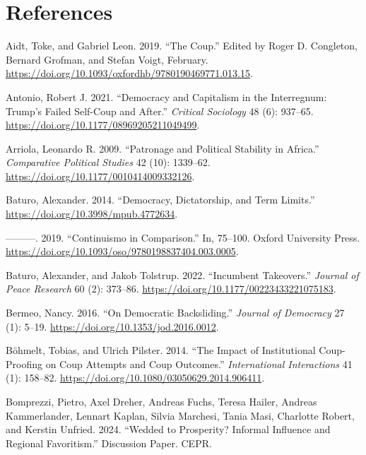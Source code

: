 \documentclass[
  12pt,
]{report}
\newlength{\cslhangindent}
\newenvironment{CSLReferences}[2] %
 {\begin{list}{}{%
  \setlength{\itemindent}{0pt}
  \setlength{\leftmargin}{0pt}
  \setlength{\parsep}{0pt}
  \ifodd #1
   \setlength{\leftmargin}{\cslhangindent}
   \setlength{\itemindent}{-1\cslhangindent}
  \fi
  \setlength{\itemsep}{#2\baselineskip}}}
 {\end{list}}
\begin{document}
\newpage

\chapter*{References}\label{references}

\label{refs}
\begin{CSLReferences}{1}{0}
Aidt, Toke, and Gabriel Leon. 2019. {``The Coup.''} Edited by Roger D.
Congleton, Bernard Grofman, and Stefan Voigt, February.
\url{https://doi.org/10.1093/oxfordhb/9780190469771.013.15}.

Antonio, Robert J. 2021. {``Democracy and Capitalism in the Interregnum:
Trump{'}s Failed Self-Coup and After.''} \emph{Critical Sociology} 48
(6): 937--65. \url{https://doi.org/10.1177/08969205211049499}.

Arriola, Leonardo R. 2009. {``Patronage and Political Stability in
Africa.''} \emph{Comparative Political Studies} 42 (10): 1339--62.
\url{https://doi.org/10.1177/0010414009332126}.

Baturo, Alexander. 2014. {``Democracy, Dictatorship, and Term Limits.''}
\url{https://doi.org/10.3998/mpub.4772634}.

---------. 2019. {``Continuismo in Comparison.''} In, 75--100. Oxford
University Press.
\url{https://doi.org/10.1093/oso/9780198837404.003.0005}.

Baturo, Alexander, and Jakob Tolstrup. 2022. {``Incumbent Takeovers.''}
\emph{Journal of Peace Research} 60 (2): 373--86.
\url{https://doi.org/10.1177/00223433221075183}.

Bermeo, Nancy. 2016. {``On Democratic Backsliding.''} \emph{Journal of
Democracy} 27 (1): 5--19. \url{https://doi.org/10.1353/jod.2016.0012}.

Böhmelt, Tobias, and Ulrich Pilster. 2014. {``The Impact of
Institutional Coup-Proofing on Coup Attempts and Coup Outcomes.''}
\emph{International Interactions} 41 (1): 158--82.
\url{https://doi.org/10.1080/03050629.2014.906411}.

Bomprezzi, Pietro, Axel Dreher, Andreas Fuchs, Teresa Hailer, Andreas
Kammerlander, Lennart Kaplan, Silvia Marchesi, Tania Masi, Charlotte
Robert, and Kerstin Unfried. 2024. {``Wedded to Prosperity? Informal
Influence and Regional Favoritism.''} Discussion Paper. CEPR.


\end{CSLReferences}
\end{document}
